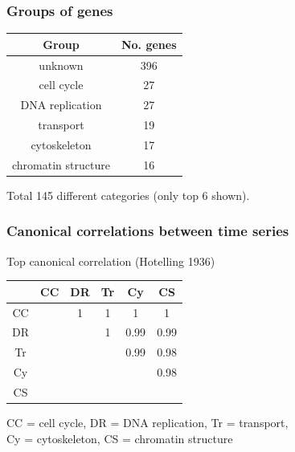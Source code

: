 \documentclass{beamer}
\begin{document}
\begin{frame}
\frametitle{Groups of genes}
\begin{center}
\begin{tabular}{c|c}
Group & No. genes \\ \hline
unknown & 396 \\
cell cycle & 27 \\
DNA replication & 27 \\
transport & 19 \\
cytoskeleton & 17\\
chromatin structure & 16 \\\hline
\end{tabular}
\end{center}

\vspace{0.5in}
Total 145 different categories (only top 6 shown).
\end{frame}


\begin{frame}
\frametitle{Canonical correlations between time series}
Top canonical correlation (Hotelling 1936)

\begin{center}
\begin{tabular}{c|c|c|c|c|c|} 
   & CC   & DR   & Tr   & Cy   & CS  \\ \hline
CC &      & 1    & 1    & 1    & 1   \\ \hline
DR &      &      & 1    & 0.99 & 0.99\\ \hline
Tr &      &      &      & 0.99 & 0.98\\ \hline
Cy &      &      &      &      & 0.98\\ \hline
CS &      &      &      &      &     \\ \hline
\end{tabular}
\end{center}

\vspace{0.5in}
CC = cell cycle, DR = DNA replication, Tr = transport, \\
Cy = cytoskeleton, CS = chromatin structure
\end{frame}

\end{document}
